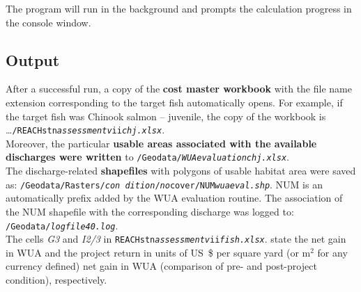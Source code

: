 The program will run in the background and prompts the calculation progress in the console window.

\subsection{Output}
After a successful run, a copy of the \textbf{cost master workbook} with the file name extension corresponding to the target fish automatically opens. For example, if the target fish was Chinook salmon -- juvenile, the copy of the workbook is \ldots{}\texttt{/REACH\emph{{\myUnderscore}}stn\emph{{\myUnderscore}assessment{\myUnderscore}v}ii\emph{{\myUnderscore}chj.xlsx}}.\\

Moreover, the particular \textbf{usable areas associated with the available discharges were written} to \texttt{/Geodata/\emph{WUA{\myUnderscore}evaluation{\myUnderscore}chj.xlsx}}.\\

The discharge-related \textbf{shapefiles} with polygons of usable habitat area were saved as: \texttt{/Geodata/Rasters/\emph{con dition}/\emph{no}{\myUnderscore}cover/NUM\emph{wua{\myUnderscore}eval.shp}}. NUM is an automatically prefix added by the WUA evaluation routine. The association of the NUM shapefile with the corresponding discharge was logged to: \texttt{/Geodata/\emph{logfile{\myUnderscore}40.log}}.\\

The cells \emph{G3} and \emph{I2/3} in \texttt{REACH\emph{{\myUnderscore}}stn\emph{{\myUnderscore}assessment{\myUnderscore}v}ii\emph{{\myUnderscore}fish.xlsx}}. state the
net gain in WUA and the project return in units of US~\$ per square yard (or m$^2$ for any currency defined) net gain in WUA (comparison of pre- and post-project condition), respectively.


 


